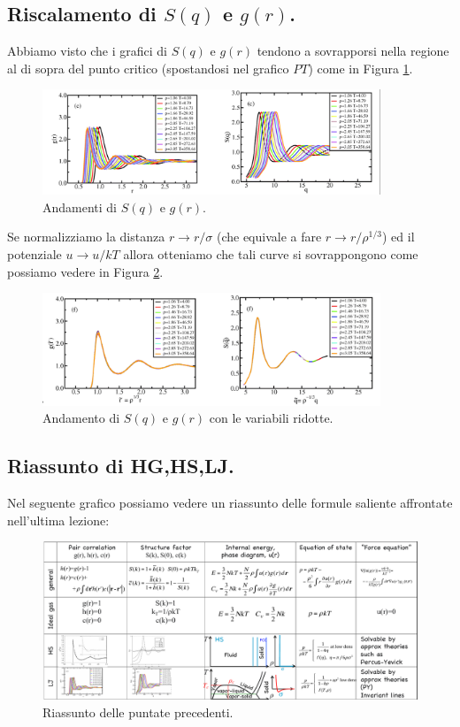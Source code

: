 \subsection{Riscalamento di $S(q)$ e $g(r)$.}
\label{subsec:Riscalamento di $S(q)$ e $g(r)$.}
Abbiamo visto che i grafici di $S(q)$ e $g(r)$ tendono a sovrapporsi nella regione al di sopra del punto critico (spostandosi nel grafico $PT$) come in Figura \ref{fig:figures-grafici-shiftati-png}.\\
\begin{figure}[ht]
	\centering
	\includegraphics[width=0.9\textwidth]{figures/grafici-shiftati.png}
	\caption{Andamenti di $S(q)$ e $g(r)$.}
	\label{fig:figures-grafici-shiftati-png}
\end{figure}
Se normalizziamo la distanza $r\to r/\sigma$ (che equivale a fare $r\to r/\rho^{1/3}$) ed il potenziale $u\to u/kT$ allora otteniamo che tali curve si sovrappongono come possiamo vedere in Figura \ref{fig:reduced-Sg}.
\begin{figure}[ht]
	\centering
	\includegraphics[width=0.9\textwidth]{figures/grafici-sovrapposti.png}
	\caption{Andamento di $S(q)$ e $g(r)$ con le variabili ridotte.}
	\label{fig:reduced-Sg}
\end{figure}
\subsection{Riassunto di HG,HS,LJ.}
\label{subsec:Riassunto di HG,HS,LJ.}
Nel seguente grafico possiamo vedere un riassunto delle formule saliente affrontate nell'ultima lezione:
\begin{figure}[H]
	\centering
	\includegraphics[width=1\textwidth]{figures/riassuntone-lez3-emezzo.png}
	\caption{Riassunto delle puntate precedenti.}
	\label{fig:figures-riassuntone-lez3-emezzo-png}
\end{figure}
